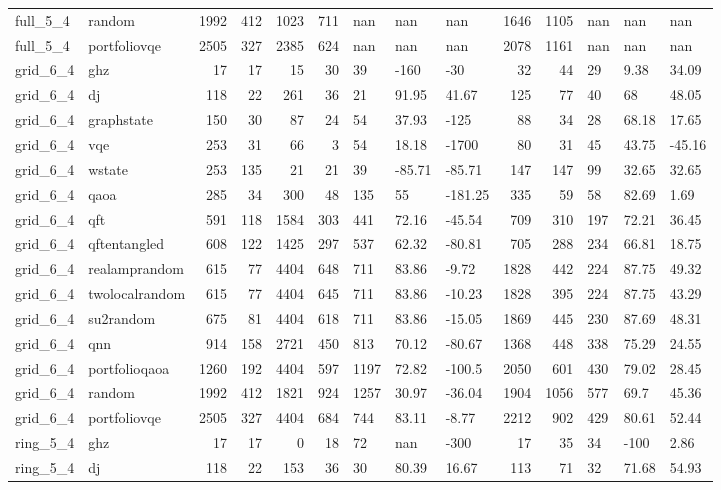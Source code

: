 \begin{longtable}{llrrrrlllrrlll}
full\_5\_4 & random & 1992 & 412 & 1023 & 711 & nan & nan & nan & 1646 & 1105 & nan & nan & nan \\
full\_5\_4 & portfoliovqe & 2505 & 327 & 2385 & 624 & nan & nan & nan & 2078 & 1161 & nan & nan & nan \\
grid\_6\_4 & ghz & 17 & 17 & 15 & 30 & 39 & -160 & -30 & 32 & 44 & 29 & 9.38 & 34.09 \\
grid\_6\_4 & dj & 118 & 22 & 261 & 36 & 21 & 91.95 & 41.67 & 125 & 77 & 40 & 68 & 48.05 \\
grid\_6\_4 & graphstate & 150 & 30 & 87 & 24 & 54 & 37.93 & -125 & 88 & 34 & 28 & 68.18 & 17.65 \\
grid\_6\_4 & vqe & 253 & 31 & 66 & 3 & 54 & 18.18 & -1700 & 80 & 31 & 45 & 43.75 & -45.16 \\
grid\_6\_4 & wstate & 253 & 135 & 21 & 21 & 39 & -85.71 & -85.71 & 147 & 147 & 99 & 32.65 & 32.65 \\
grid\_6\_4 & qaoa & 285 & 34 & 300 & 48 & 135 & 55 & -181.25 & 335 & 59 & 58 & 82.69 & 1.69 \\
grid\_6\_4 & qft & 591 & 118 & 1584 & 303 & 441 & 72.16 & -45.54 & 709 & 310 & 197 & 72.21 & 36.45 \\
grid\_6\_4 & qftentangled & 608 & 122 & 1425 & 297 & 537 & 62.32 & -80.81 & 705 & 288 & 234 & 66.81 & 18.75 \\
grid\_6\_4 & realamprandom & 615 & 77 & 4404 & 648 & 711 & 83.86 & -9.72 & 1828 & 442 & 224 & 87.75 & 49.32 \\
grid\_6\_4 & twolocalrandom & 615 & 77 & 4404 & 645 & 711 & 83.86 & -10.23 & 1828 & 395 & 224 & 87.75 & 43.29 \\
grid\_6\_4 & su2random & 675 & 81 & 4404 & 618 & 711 & 83.86 & -15.05 & 1869 & 445 & 230 & 87.69 & 48.31 \\
grid\_6\_4 & qnn & 914 & 158 & 2721 & 450 & 813 & 70.12 & -80.67 & 1368 & 448 & 338 & 75.29 & 24.55 \\
grid\_6\_4 & portfolioqaoa & 1260 & 192 & 4404 & 597 & 1197 & 72.82 & -100.5 & 2050 & 601 & 430 & 79.02 & 28.45 \\
grid\_6\_4 & random & 1992 & 412 & 1821 & 924 & 1257 & 30.97 & -36.04 & 1904 & 1056 & 577 & 69.7 & 45.36 \\
grid\_6\_4 & portfoliovqe & 2505 & 327 & 4404 & 684 & 744 & 83.11 & -8.77 & 2212 & 902 & 429 & 80.61 & 52.44 \\
ring\_5\_4 & ghz & 17 & 17 & 0 & 18 & 72 & nan & -300 & 17 & 35 & 34 & -100 & 2.86 \\
ring\_5\_4 & dj & 118 & 22 & 153 & 36 & 30 & 80.39 & 16.67 & 113 & 71 & 32 & 71.68 & 54.93 \\

\end{longtable}
